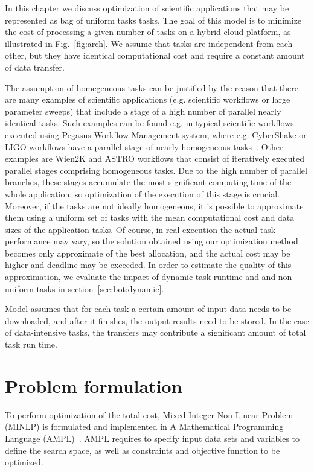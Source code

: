 {  In this chapter we discuss optimization of scientific applications that may be represented as bag of uniform tasks tasks. The goal of this model is to minimize the cost of processing a given number of tasks on a hybrid cloud platform, as illustrated in Fig.~\ref{fig:arch}. We assume that tasks are independent from each other, but they have identical computational cost and require a constant amount of data transfer. 

  The assumption of homegeneous tasks can be justified by the reason that there are many examples of scientific applications (e.g. scientific workflows or large parameter sweeps) that include a stage of a high number of parallel nearly identical tasks. Such examples can be found e.g. in typical scientific workflows executed using Pegasus Workflow Management system, where e.g. CyberShake or LIGO workflows have a parallel stage of nearly homogeneous tasks~\cite{Bharathi08}. Other examples are Wien2K and ASTRO workflows that consist of iteratively executed parallel stages comprising homogeneous tasks\cite{Duan12}. Due to the high number of parallel branches, these stages accumulate the most significant computing time of the whole application, so optimization of the execution of this stage is crucial. Moreover, if the tasks are not ideally homogeneous, it is possible to approximate them using a uniform set of tasks with the mean computational cost and data sizes of the application tasks. Of course, in real execution the actual task performance may vary, so the solution obtained using our optimization method becomes only approximate of the best allocation, and the actual cost may be higher and deadline may be exceeded. In order to estimate the quality of this approximation, we evaluate the impact of dynamic task runtime and and non-uniform tasks in section~\ref{sec:bot:dynamic}. 

  Model assumes that for each task a certain amount of input data needs to be downloaded, and after it finishes, the output results need to be stored. In the case of data-intensive tasks, the transfers may contribute a significant amount of total task run time.

\section{Problem formulation}
\label{sec:bot:problem}

  To perform optimization of the total cost, Mixed Integer Non-Linear Problem (MINLP) is formulated and implemented in A Mathematical Programming Language (AMPL)~\cite{Fourer2002}.  AMPL requires to specify input data sets and variables to define the search space, as well as constraints and objective function to be optimized.

}
